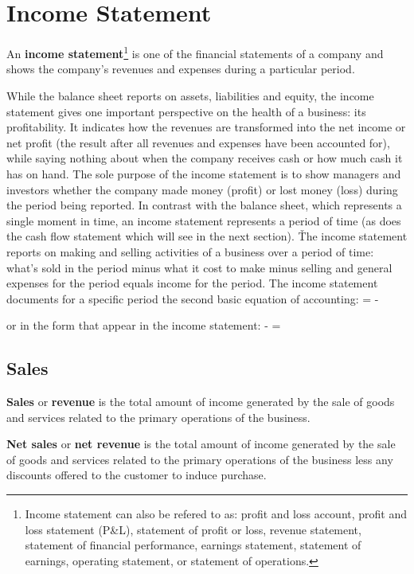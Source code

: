 \section{Income Statement}

An \textbf{income statement}\footnote{Income statement can also be refered to as: profit and loss account, profit
and loss statement (P\&L), statement of profit or loss, revenue statement, statement of financial performance,
earnings statement, statement of earnings, operating statement, or statement of operations.} is one of the financial
statements of a company and shows the company's revenues and expenses during a particular period.
\ed

While the balance sheet reports on assets, liabilities and equity, the income statement gives one important
perspective on the health of a business: its profitability. It indicates how the revenues are transformed into the
net income or net profit (the result after all revenues and expenses have been accounted for), while saying nothing
about when the company receives cash or how much cash it has on hand. The sole purpose of the income statement is to
show managers and investors whether the company made money (profit) or lost money (loss) during the period being
reported. In contrast with the balance sheet, which represents a single moment in time, an income statement
represents a period of time (as does the cash flow statement which will see in the next section). \v

The income statement reports on making and selling activities of a business over a period of time: what's sold in the
period minus what it cost to make minus selling and general expenses for the period equals income for the period. The
income statement documents for a specific period the second basic equation of accounting:
\bse
{} =  - 
\ese

or in the form that appear in the income statement:
\bse
{} -  = 
\ese

\subsection{Sales}

\textbf{Sales} or \textbf{revenue} is the total amount of income generated by the sale of goods and services related to
the
primary operations of the business.
\ed

\textbf{Net sales} or \textbf{net revenue} is the total amount of income generated by the sale of goods and services
related to the primary operations of the business less any discounts offered to the customer to induce purchase.
\ed

